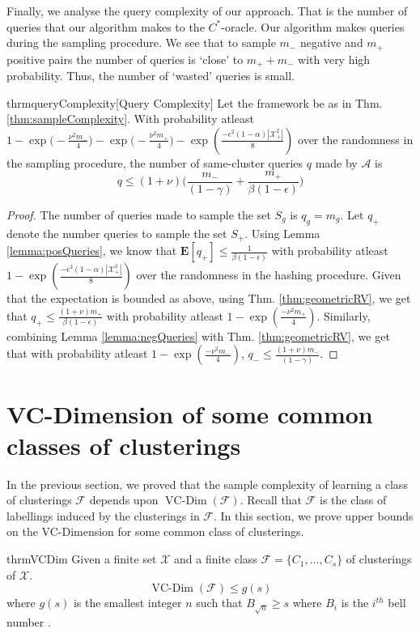 \documentclass[12pt]{article}
\newcommand{\mb}{\mathbf}
\newcommand{\mc}{\mathcal}
\DeclareMathOperator*{\vcdim}{VC-Dim}
\begin{document}
Finally, we analyse the query complexity of our approach. That is the number of queries that our algorithm makes to the $C^*$-oracle. Our algorithm makes queries during the sampling procedure. We see that to sample $m_-$ negative and $m_+$ positive pairs the number of queries is `close' to $m_+ + m_-$ with very high probability. Thus, the number of `wasted' queries is small.  

\begin{restatable}{thrm}{queryComplexity}[Query Complexity]
\label{thm:queryComplexity}
Let the framework be as in Thm. \ref{thm:sampleComplexity}. With probability atleast $1-\exp\big(-\frac{\nu^2m_-}{4}) - \exp\big(-\frac{\nu^2m_+}{4}\big) - \exp(\frac{-\epsilon^2(1-\alpha)|\mc X_+^2|}{8})$ over the randomness in the sampling procedure, the number of same-cluster queries $q$ made by $\mc A$ is  
$$q \le (1+\nu)\bigg(\frac{m_-}{(1-\gamma)} + \frac{m_+}{\beta(1-\epsilon)}\bigg)$$
\end{restatable}

\begin{proof}
The number of queries made to sample the set $S_g$ is $q_g = m_g$. Let $q_+$ denote the number queries to sample the set $S_+$. Using Lemma \ref{lemma:posQueries}, we know that $\mb E[q_+] \le \frac{1}{\beta(1-\epsilon)}$ with probability atleast $1-\exp(\frac{-\epsilon^2(1-\alpha)|\mc X_+^2|}{8})$ over the randomness in the hashing procedure. Given that the expectation is bounded as above, using Thm. \ref{thm:geometricRV}, we get that $q_+ \le \frac{(1+\nu)m_+}{\beta(1-\epsilon)}$ with probability atleast $1-\exp(\frac{-\nu^2m_+}{4})$. Similarly, combining Lemma \ref{lemma:negQueries} with Thm. \ref{thm:geometricRV}, we get that with probability atleast $1-\exp(\frac{-\nu^2m_-}{4})$, $q_- \le \frac{(1+\nu)m_-}{(1-\gamma)}$.
\end{proof}

\section{VC-Dimension of some common classes of clusterings}
In the previous section, we proved that the sample complexity of learning a class of clusterings $\mc F$ depends upon $\vcdim({\mc F})$. Recall that ${\mc F}$ is the class of labellings induced by the clusterings in $\mc F$. In this section, we prove upper bounds on the VC-Dimension for some common class of clusterings. 

\begin{restatable}{thrm}{VCDim}
Given a finite set $\mc X$ and a finite class $\mc F = \{C_1, \ldots, C_s\}$ of clusterings of $\mc X$.
$$\vcdim({\mc F}) \le g(s)$$ where $g(s)$ is the smallest integer $n$ such that $B_{\sqrt n} \ge s$ where $B_i$ is the $i^{th}$ bell number \cite{bell2010number}. 
\end{restatable}
\end{document}
